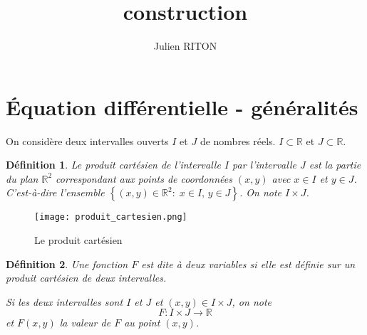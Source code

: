 \documentclass[10pt,a4paper]{article}
\author{Julien RITON}
\title{construction}
\newtheorem{dfn}{Définition}
\begin{document}
\section{Équation différentielle - généralités}

On considère deux intervalles ouverts $I$ et $J$ de nombres réels.
$I\subset \mathbb{R}$ et $J\subset \mathbb{R}$.

\begin{dfn}
Le \textit{produit cartésien} de l'intervalle $I$ par l'intervalle $J$ est la partie du plan
$\mathbb{R}^2$
correspondant aux points de coordonnées $(x,y)$ avec $x\in I$ et $y\in J$.
C'est-à-dire l'ensemble $\left\lbrace (x,y) \in \mathbb{R}^2:\; x\in I,\, y\in J \right\rbrace$.
On note $I\times J$.
\end{dfn}
\begin{figure}[hbtp]
\centering
\texttt{[image: produit\_cartesien.png]}
\caption{Le produit cartésien}
\end{figure}

\begin{dfn}
Une fonction $F$ est dite à deux variables si elle est définie sur un produit cartésien de deux intervalles.

Si les deux intervalles sont $I$ et $J$ et $(x,y)\in I \times J$, on note 
$$F:I\times J \rightarrow \mathbb{R}$$
et $F(x,y)$ la valeur de $F$ au point $(x,y)$.
\end{dfn}
\end{document}
